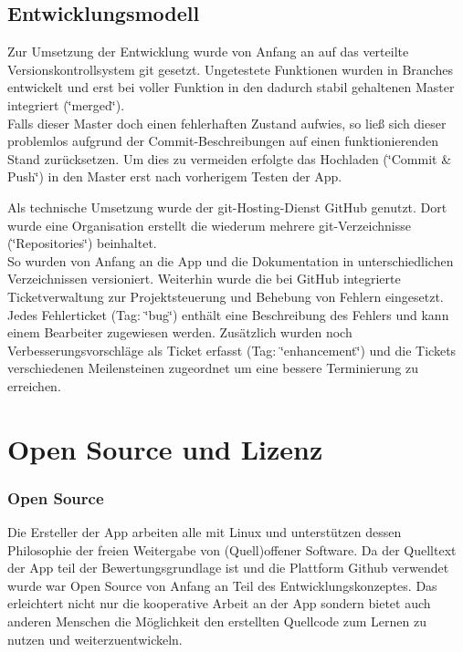 \documentclass[a4paper,ngerman,12pt]{report}
\begin{document}
\section{Entwicklungsmodell}

Zur Umsetzung der Entwicklung wurde von Anfang an auf das verteilte Versionskontrollsystem git gesetzt. Ungetestete Funktionen wurden in Branches entwickelt und erst bei voller Funktion in den dadurch stabil gehaltenen Master integriert (\char`\"{}merged\char`\"{}). \\
Falls dieser Master doch einen fehlerhaften Zustand aufwies, so ließ sich dieser problemlos aufgrund der Commit-Beschreibungen auf einen funktionierenden Stand zurücksetzen. Um dies zu vermeiden erfolgte das Hochladen (\char`\"{}Commit \& Push\char`\"{}) in den Master erst nach vorherigem Testen der App. 

Als technische Umsetzung wurde der git-Hosting-Dienst GitHub genutzt. Dort wurde eine Organisation erstellt die wiederum mehrere git-Verzeichnisse (\char`\"{}Repositories\char`\"{}) beinhaltet. \\
So wurden von Anfang an die App und die Dokumentation in unterschiedlichen Verzeichnissen versioniert. Weiterhin wurde die bei GitHub integrierte Ticketverwaltung zur Projektsteuerung und Behebung von Fehlern eingesetzt.\\
Jedes Fehlerticket (Tag: \char`\"{}bug\char`\"{}) enthält eine Beschreibung des Fehlers und kann einem Bearbeiter zugewiesen werden. Zusätzlich wurden noch Verbesserungsvorschläge als Ticket erfasst (Tag: \char`\"{}enhancement\char`\"{}) und die Tickets verschiedenen Meilensteinen zugeordnet um eine bessere Terminierung zu erreichen. 

\chapter{Open Source und Lizenz}
\subsection*{Open Source}
Die Ersteller der App arbeiten alle mit Linux und unterstützen dessen Philosophie der freien Weitergabe von (Quell)offener Software. Da der Quelltext der App teil der Bewertungsgrundlage ist und die Plattform Github verwendet wurde war Open Source von Anfang an Teil des Entwicklungskonzeptes. Das erleichtert nicht nur die kooperative Arbeit an der App sondern bietet auch anderen Menschen die Möglichkeit den erstellten Quellcode zum Lernen zu nutzen und weiterzuentwickeln.
\end{document}
